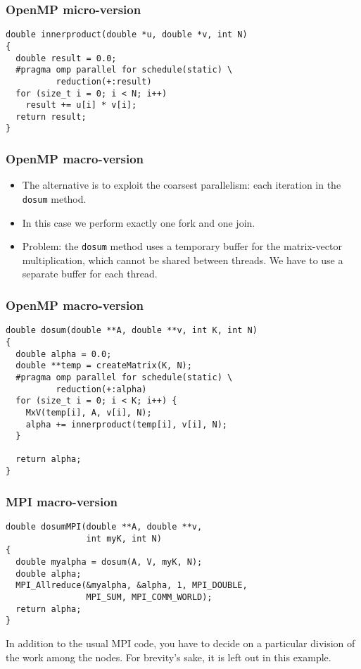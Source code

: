 \begin{frame}[fragile]
  \frametitle{OpenMP micro-version}
\begin{lstlisting}[style=c]
double innerproduct(double *u, double *v, int N)
{
  double result = 0.0;
  #pragma omp parallel for schedule(static) \
          reduction(+:result)
  for (size_t i = 0; i < N; i++)
    result += u[i] * v[i];
  return result;
}
\end{lstlisting}
\end{frame}

\begin{frame}
  \frametitle{OpenMP macro-version}
  \begin{itemize}
  \item The alternative is to exploit the coarsest parallelism: each iteration
    in the \texttt{dosum} method.
  \item In this case we perform exactly one fork and one join.
  \item Problem: the \texttt{dosum} method uses a temporary buffer for the
    matrix-vector multiplication, which cannot be shared between threads. We
    have to use a separate buffer for each thread.
  \end{itemize}
\end{frame}

\begin{frame}[fragile]
  \frametitle{OpenMP macro-version}
\begin{lstlisting}[style=c]
double dosum(double **A, double **v, int K, int N)
{
  double alpha = 0.0;
  double **temp = createMatrix(K, N);
  #pragma omp parallel for schedule(static) \
          reduction(+:alpha)
  for (size_t i = 0; i < K; i++) {
    MxV(temp[i], A, v[i], N);
    alpha += innerproduct(temp[i], v[i], N);
  }

  return alpha;
}
\end{lstlisting}
\end{frame}

\begin{frame}[fragile]
  \frametitle{MPI macro-version}
\begin{lstlisting}[style=c]
double dosumMPI(double **A, double **v,
                int myK, int N)
{
  double myalpha = dosum(A, V, myK, N);
  double alpha;
  MPI_Allreduce(&myalpha, &alpha, 1, MPI_DOUBLE,
                MPI_SUM, MPI_COMM_WORLD);
  return alpha;
}
\end{lstlisting}
  In addition to the usual MPI code, you have to decide on a particular division
  of the work among the nodes. For brevity's sake, it is left out in this
  example.
\end{frame}

